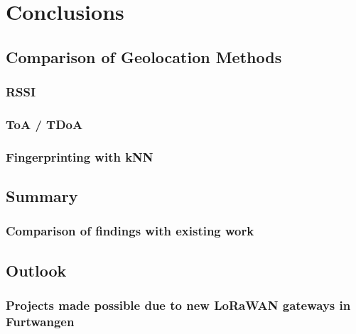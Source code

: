 \chapter{Conclusions}

\section{Comparison of Geolocation Methods}

\subsection{\ac{RSSI}}

\subsection{\ac{ToA} / \ac{TDoA}}


\subsection{Fingerprinting with \ac{kNN}}

\section{Summary}

\subsection{Comparison of findings with existing work}


\section{Outlook}


\subsection{Projects made possible due to new \ac{LoRaWAN} gateways in Furtwangen}

